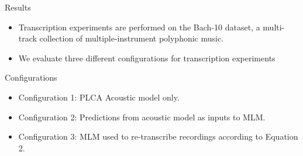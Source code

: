 \documentclass[final]{beamer}
\newlength{\onecolwid}
\newlength{\twocolwid}
\begin{document}
\begin{frame}[t]
\begin{columns}[t]
\begin{column}{\twocolwid}
\begin{columns}[t,totalwidth=\twocolwid]
\begin{column}{\onecolwid}
\begin{block}{Results}
\begin{table}[t]
 \begin{center}
\end{center}
 \caption{Transcription results using various system configurations.}
 \label{tab:results}
\end{table}

\begin{itemize}
\item Transcription experiments are performed on the Bach-10 dataset, a multi-track collection of multiple-instrument polyphonic music.
\item We evaluate three different configurations for transcription experiments
\end{itemize}

\begin{alertblock}{Configurations}
\begin{itemize}
\item Configuration 1: PLCA Acoustic model only. \\
\item Configuration 2: Predictions from acoustic model as inputs to MLM. 
\item Configuration 3: MLM used to re-transcribe recordings according to Equation 2.
\end{itemize}
\end{alertblock}


\end{block}
\end{column}
\end{columns}
\end{column}
\end{columns}
\end{frame}
\end{document}
